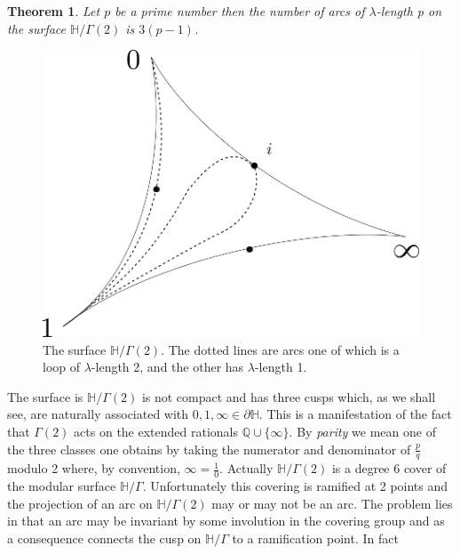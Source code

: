 \documentclass[12pt,a4paper]{amsart}
\newtheorem{thm}{Theorem}[section]
\def\HH{\mathbb{H}}
\def\g2{\Gamma(2)}
\def\xx{\HH/\g2}
\begin{document}
\begin{thm}\label{g2 arcs}
	Let $p$ be a prime number then the number of arcs of
	$\lambda$-length p on the surface
	$\xx$ is $3(p-1)$.
\end{thm}


 \begin{figure}[H]
\begin{center}
\includegraphics[scale=.3]{3sphere.png} 
\end{center}
\caption{The surface $\xx$. The dotted lines are arcs one of which
is a loop of $\lambda$-length 2, and the other has $\lambda$-length 1.}
\label{3sphere}
\end{figure}

The surface is $\xx$ is not compact and has three cusps which, as we
shall see, are naturally associated with $0,1,\infty \in \partial \mathbb{H}$.
This is a manifestation of the fact that $\g2$ acts on the extended
rationals $\mathbb{Q} \cup \{\infty\}$.
By \textit{parity} we mean one
of the three classes one obtains by taking the 
numerator and denominator of $\frac{p}{q}$ modulo 2
where, by convention, $\infty = \frac{1}{0}$.
Actually $\xx$ is a degree 6 cover of the modular surface
$\mathbb{H}/\Gamma$. 
Unfortunately this covering is ramified at 2 points and
the projection of an arc on $\xx$ may or may not be an arc.
The problem lies in that an arc may be invariant by some involution
in the covering group and as a consequence connects the cusp on
$\mathbb{H}/\Gamma$ to a ramification point.
In fact 
\end{document}
